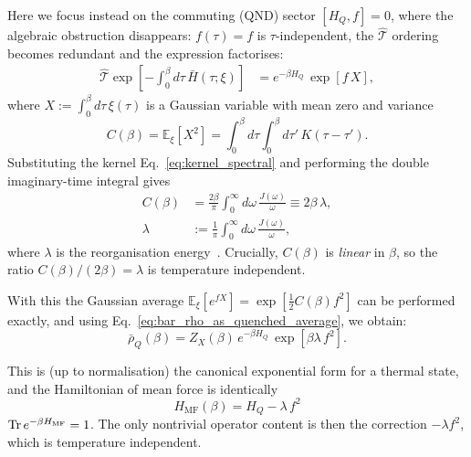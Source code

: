 Here we focus instead on the commuting (QND) sector $[H_Q,f]=0$, where the algebraic obstruction disappears: $f(\tau)=f$ is $\tau$-independent, the $\hat{\mathcal{T}}$ ordering becomes redundant and the expression factorises:
\begin{align}
    \hat{\mathcal{T}}\exp\!\left[-\int_0^\beta d\tau\,\bar{H}(\tau;\xi)\right]
    &=
    e^{-\beta H_Q}\, \exp\!\left[f\,X\right],
    \label{eq:tilde_rho_commuting_factorised}
\end{align}
where $X:=\int_0^\beta d\tau\,\xi(\tau)$ is a Gaussian variable with mean zero and variance
\begin{equation}
    C(\beta) = \mathbb E_\xi[X^2] = \int_0^\beta d\tau\int_0^\beta d\tau'\,K(\tau-\tau').
    \label{eq:Cbeta_def}
\end{equation}
Substituting the kernel Eq.~\eqref{eq:kernel_spectral} and performing the double
imaginary-time integral gives
\begin{align}
    C(\beta)
    &=\frac{2\beta}{\pi}\int_0^\infty d\omega\,\frac{J(\omega)}{\omega}
    \equiv 2\beta\,\lambda,
    \nonumber\\
    \lambda&:=\frac{1}{\pi}\int_0^\infty d\omega\,\frac{J(\omega)}{\omega},
    \label{eq:Cbeta_explicit}
\end{align}
where $\lambda$ is the reorganisation energy~\cite{weissQuantumDissipativeSystems2012, leggettDynamicsDissipativeTwostate1987}.
Crucially, $C(\beta)$ is \emph{linear} in $\beta$, so the ratio $C(\beta)/(2\beta)=\lambda$ is temperature independent.

With this the Gaussian average $\mathbb E_\xi[e^{f X}] = \exp[\frac{1}{2}C(\beta)f^2]$ can be performed exactly, and using Eq.~\eqref{eq:bar_rho_as_quenched_average}, we obtain:
\begin{equation}
    \bar\rho_Q(\beta) = Z_X(\beta)\,e^{-\beta H_Q}\,\exp\!\left[\beta\lambda\,f^2\right].
    \label{eq:bar_rho_commuting_closed}
\end{equation}

This is (up to normalisation) the canonical exponential form for a thermal state, and the Hamiltonian of mean force is identically
\begin{equation}
    H_{\mathrm{MF}}(\beta) = H_Q -\lambda\,f^2 
    \label{eq:HMF_commuting_final}
\end{equation}
$\mathrm{Tr}\,e^{-\beta H_{\mathrm{MF}}}=1$. The only nontrivial operator content is then the correction $-\lambda f^2$, which is temperature independent.

